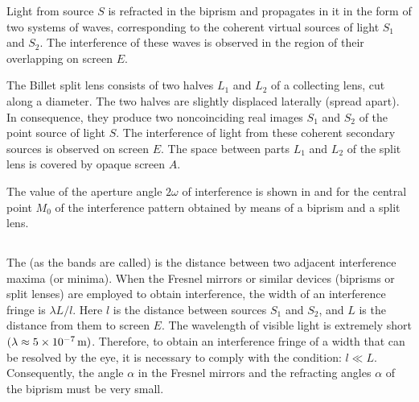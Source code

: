 Light from source $S$ is refracted in the biprism and propagates in it in the form of two systems of waves, corresponding to the coherent virtual sources of light $S_{1}$ and $S_{2}$. The interference of these waves is observed in the region of their overlapping on screen $E$.

The Billet split lens consists of two halves $L_{1}$ and $L_{2}$ of a collecting lens, cut along a diameter. The two halves are slightly displaced laterally (spread apart). In consequence, they produce two noncoinciding real images $S_{1}$ and $S_{2}$ of the point source of light $S$. The interference of light from these coherent secondary sources is observed on screen $E$. The space between parts $L_{1}$ and $L_{2}$ of the split lens is covered by opaque screen $A$.

The value of the aperture angle $2\omega$ of interference is shown in  and  for the central point $M_{0}$ of the interference pattern obtained by means of a biprism and a split lens.

\subsection{}\label{32.2.3} The  (as the bands are called) is the distance between two adjacent interference maxima (or minima). When the Fresnel mirrors or similar devices (biprisms or split lenses) are employed to obtain interference, the width of an interference fringe  is $\lambda L/l$. Here $l$ is the distance between sources $S_{1}$ and $S_{2}$, and $L$ is the distance from them to screen $E$. The wavelength of visible light is extremely short $(\lambda \approx \SI{5d-7}{\meter})$. Therefore, to obtain an interference fringe of a width that can be resolved by the eye, it is necessary
to comply with the condition: $l \ll L$. Consequently, the angle $\alpha$ in the Fresnel mirrors and the refracting angles $\alpha$ of the biprism must be very small.

